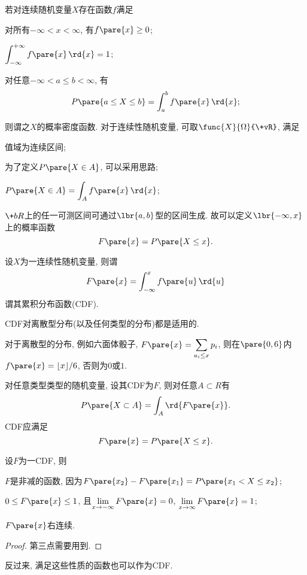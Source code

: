 \documentclass[../Statistics.tex]{subfiles}
\begin{document}
若对连续随机变量$X$存在函数$f$满足
\begin{cenum}
    \item 对所有$-\infty < x < \infty$, 有$f\pare{x}\ge 0$;
    \item $\displaystyle \int_{-\infty}^{+\infty}f\pare{x}\,\rd{x}  = 1$;
    \item 对任意$-\infty < a \le b < \infty$, 有
    \[ P\pare{a\le X \le b} = \int_a^b f\pare{x}\,\rd{x}; \]
\end{cenum}
则谓之$X$的概率密度函数. 对于连续性随机变量, 可取$\func{X}{\Omega}{\+vR}$, 满足
\begin{cenum}
    \item 值域为连续区间;
    \item 为了定义$P\pare{X\in A}$, 可以采用思路;
    \begin{cenum}
        \item $P\pare{X\in A} = \displaystyle \int_A f\pare{x}\,\rd{x}$;
        \item $\+bR$上的任一可测区间可通过$\lbr{a,b}$型的区间生成. 故可以定义$\lbr{-\infty, x}$上的概率函数
\[ F\pare{x} = P\pare{X \le x}. \]
    \end{cenum}
\end{cenum}
设$X$为一连续性随机变量, 则谓
\[ F\pare{x} = \int_{-\infty}^x f\pare{u}\,\rd{u} \]
谓其累积分布函数(CDF).
\begin{remark}
    CDF对离散型分布(以及任何类型的分布)都是适用的.
\end{remark}
\begin{sample}
    \begin{ex}
        对于离散型的分布, 例如六面体骰子, $F\pare{x} = \displaystyle \sum_{a_i \le x} p_i$, 则在$\pare{0,6}$内$f\pare{x} = \lfloor{x}\rfloor{}/6$, 否则为$0$或$1$.
    \end{ex}
\end{sample}
对任意类型类型的随机变量, 设其CDF为$F$, 则对任意$A\subset R$有
\[ P\pare{X\subset A} = \int_A \rd{F\pare{x}}. \]
CDF应满足
\[ F\pare{x} = P\pare{X\le x}. \]
\begin{lemma}[CDF的性质]
    设$F$为一CDF, 则
    \begin{cenum}
        \item $F$是非减的函数, 因为$F\pare{x_2} - F\pare{x_1} = P\pare{x_1 < X \le x_2}$;
        \item $0\le F\pare{x} \le 1$, 且$\displaystyle \lim_{x\rightarrow -\infty} F\pare{x} = 0$, $\displaystyle \lim_{x\rightarrow\infty} F\pare{x} = 1$;
        \item {\color{red}$F\pare{x}$右连续.}
    \end{cenum}    
\end{lemma}
\begin{proof}
    第三点需要用到.
\end{proof}
反过来, 满足这些性质的函数也可以作为CDF.
\end{document}
